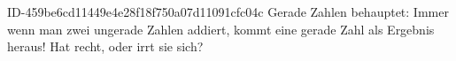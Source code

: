\begin{exercise}
      {ID-459be6cd11449e4e28f18f750a07d11091cfc04c}
      {Gerade Zahlen}
  \ifproblem\problem
    \xxa{} behauptet: \glqq Immer wenn man zwei ungerade Zahlen addiert, kommt eine
    gerade Zahl als Ergebnis heraus!\grqq{} Hat \xxa{} recht, oder irrt sie sich?
  \fi
\end{exercise}

